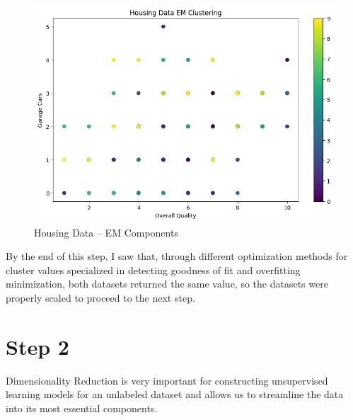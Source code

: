 \documentclass[conference]{IEEEtran}
\begin{document}
\begin{figure}
    \centering
    \includegraphics[width=1.0\linewidth]{figures//housing_figures/step_1d.png}
    \caption{Housing Data -- EM Components}
    \label{fig:4_housing_EM
}
\end{figure}
By the end of this step, I saw that, through different optimization methods for cluster values specialized in detecting goodness of fit and overfitting minimization, both datasets returned the same value, so the datasets were properly scaled to proceed to the next step.
\section{Step 2}
Dimensionality Reduction is very important for constructing unsupervised learning models for an unlabeled dataset and allows us to streamline the data into its most essential components. 
\end{document}
